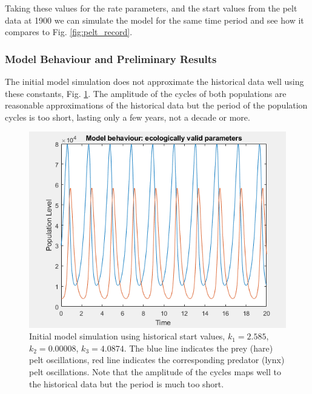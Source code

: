 \documentclass{article}
\begin{document}
Taking these values for the rate parameters, and the start values from the pelt data at 1900 we can simulate the model for the same time period and see how it compares to Fig. \ref{fig:pelt_record}.

\subsubsection{Model Behaviour and Preliminary Results}
The initial model simulation does not approximate the historical data well using these constants, Fig. \ref{fig:results_1}. The amplitude of the cycles of both populations are reasonable approximations of the historical data but the period of the population cycles is too short, lasting only a few years, not a decade or more.  
\begin{figure}[H]
    \includegraphics[width = \textwidth]{results_1.PNG}
    \caption{Initial model simulation using historical start values, $k_1 = 2.585$, $k_2 = 0.00008$, $k_3 = 4.0874$. The blue line indicates the prey (hare) pelt oscillations, red line indicates the corresponding predator (lynx) pelt oscillations. Note that the amplitude of the cycles maps well to the historical data but the period is much too short.}
    \label{fig:results_1}
\end{figure}
\end{document}
